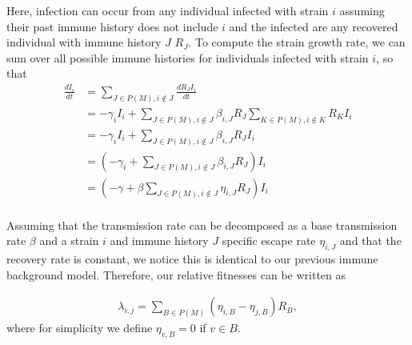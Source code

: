 \documentclass[12pt,oneside,letterpaper]{article}
\begin{document}
Here, infection can occur from any individual infected with strain $i$ assuming their past immune history does not include $i$ and the infected are any recovered individual with immune history $J$  $R_{J}$.
To compute the strain growth rate, we can sum over all possible immune histories for individuals infected with strain $i$, so that
\begin{align*}
    \frac{d I_{i}}{d t} &= \sum_{J \in P(M), i \notin J} \frac{dR_{J} I_{i}}{dt} \\
                        &= - \gamma_{i} I_{i} + \sum_{J \in P(M), i \notin J} \beta_{i, J} R_{J} \sum_{K \in P(M), i\notin K} R_{K}I_{i}\\
                        &= - \gamma_{i} I_{i} + \sum_{J \in P(M), i \notin J} \beta_{i, J} R_{J} I_{i}\\
                        &= \left(-\gamma_{i} + \sum_{J \in P(M), i \notin J} \beta_{i,J} R_{J} \right) I_{i}\\
                        &= \left(-\gamma + \beta\sum_{J \in P(M), i \notin J} \eta_{i,J} R_{J} \right) I_{i}\\
\end{align*}

Assuming that the transmission rate can be decomposed as a base transmission rate $\beta$ and a strain $i$ and immune history $J$ specific escape rate $\eta_{i, J}$ and that the recovery rate is constant, we notice this is identical to our previous immune background model.
Therefore, our relative fitnesses can be written as

\begin{align*}
    \lambda_{i, j} = \sum_{B \in P(M)} (\eta_{i, B} - \eta_{j, B}) R_{B},
\end{align*}
where for simplicity we define $\eta_{v, B} = 0$ if $v \in B$.
\end{document}
